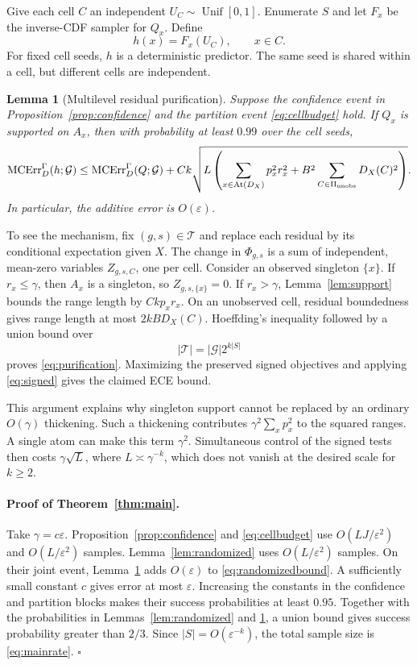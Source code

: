 \documentclass{article}
\newtheorem{lemma}[theorem]{Lemma}
\theoremstyle{definition}
\theoremstyle{remark}
\newcommand{\1}{\mathbf 1}
\newcommand{\cG}{\mathcal G}
\newcommand{\MCE}{\operatorname{MCErr}}
\newcommand{\At}{\operatorname{At}}
\begin{document}
Give each cell $C$ an independent $U_C\sim\operatorname{Unif}[0,1]$. Enumerate $S$ and let $F_x$ be the inverse-CDF sampler for $Q_x$. Define
\begin{equation}
h(x)=F_x(U_C),\qquad x\in C.
\label{eq:rounding}
\end{equation}
For fixed cell seeds, $h$ is a deterministic predictor. The same seed is shared within a cell, but different cells are independent.

\begin{lemma}[Multilevel residual purification]\label{lem:purification}
Suppose the confidence event in Proposition~\ref{prop:confidence} and the partition event \eqref{eq:cellbudget} hold. If $Q_x$ is supported on $A_x$, then with probability at least $0.99$ over the cell seeds,
\begin{equation}
\MCE_D^\Gamma(h;\cG)
\le \MCE_D^\Gamma(Q;\cG)
+Ck\sqrt{L\left(\sum_{x\in\At(D_X)}p_x^2r_x^2+
B^2\sum_{C\in\Pi_{\rm unobs}}D_X(C)^2\right)}.
\label{eq:purification}
\end{equation}
In particular, the additive error is $O(\varepsilon)$.
\end{lemma}

To see the mechanism, fix $(g,s)\in\mathcal T$ and replace each residual by its conditional expectation given $X$. The change in $\Phi_{g,s}$ is a sum of independent, mean-zero variables $Z_{g,s,C}$, one per cell. Consider an observed singleton $\{x\}$. If $r_x\le\gamma$, then $A_x$ is a singleton, so $Z_{g,s,\{x\}}=0$. If $r_x>\gamma$, Lemma~\ref{lem:support} bounds the range length by $Ckp_xr_x$. On an unobserved cell, residual boundedness gives range length at most $2kB D_X(C)$. Hoeffding's inequality followed by a union bound over
\[
|\mathcal T|=|\cG|2^{k|S|}
\]
proves \eqref{eq:purification}. Maximizing the preserved signed objectives and applying \eqref{eq:signed} gives the claimed ECE bound.

This argument explains why singleton support cannot be replaced by an ordinary $O(\gamma)$ thickening. Such a thickening contributes $\gamma^2\sum_xp_x^2$ to the squared ranges. A single atom can make this term $\gamma^2$. Simultaneous control of the signed tests then costs $\gamma\sqrt{L}$, where $L\asymp\gamma^{-k}$, which does not vanish at the desired scale for $k\ge2$.

\paragraph{Proof of Theorem~\ref{thm:main}.} Take $\gamma=c\varepsilon$. Proposition~\ref{prop:confidence} and \eqref{eq:cellbudget} use $O(LJ/\varepsilon^2)$ and $O(L/\varepsilon^2)$ samples. Lemma~\ref{lem:randomized} uses $O(L/\varepsilon^2)$ samples. On their joint event, Lemma~\ref{lem:purification} adds $O(\varepsilon)$ to \eqref{eq:randomizedbound}. A sufficiently small constant $c$ gives error at most $\varepsilon$. Increasing the constants in the confidence and partition blocks makes their success probabilities at least $0.95$. Together with the probabilities in Lemmas~\ref{lem:randomized} and \ref{lem:purification}, a union bound gives success probability greater than $2/3$. Since $|S|=O(\varepsilon^{-k})$, the total sample size is \eqref{eq:mainrate}. \hfill$\square$
\end{document}
